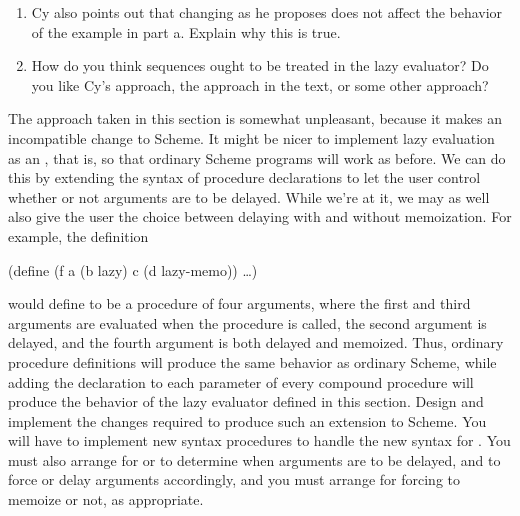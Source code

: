 \begin{exercise}
\begin{enumerate}[label = \alph*., leftmargin = *]
\begin{scheme}
			  (define (p2 x)
			    (define (p e)
			      e
			      x)
			    (p (set! x (cons x '(2)))))
			\end{scheme}
			What are the values of  and  with the original ?
			What would the values be with Cy’s proposed change to ?

		\item
			Cy also points out that changing  as he proposes does not affect the behavior of the example in part a.
			Explain why this is true.

		\item
			How do you think sequences ought to be treated in the lazy evaluator?
			Do you like Cy’s approach, the approach in the text, or some other approach?

	\end{enumerate}
\end{exercise}



\begin{exercise}
	\label{Exercise 4.31}
	The approach taken in this section is somewhat unpleasant, because it makes an incompatible change to Scheme.
	It might be nicer to implement lazy evaluation as an , that is, so that ordinary Scheme programs will work as before.
	We can do this by extending the syntax of procedure declarations to let the user control whether or not arguments are to be delayed.
	While we’re at it, we may as well also give the user the choice between delaying with and without memoization.
	For example, the definition
	\begin{scheme}
	  (define (f a (b lazy) c (d lazy-memo))
	    …)
	\end{scheme}
	would define  to be a procedure of four arguments, where the first and third arguments are evaluated when the procedure is called, the second argument is delayed, and the fourth argument is both delayed and memoized.
	Thus, ordinary procedure definitions will produce the same behavior as ordinary Scheme, while adding the  declaration to each parameter of every compound procedure will produce the behavior of the lazy evaluator defined in this section.
	Design and implement the changes required to produce such an extension to Scheme.
	You will have to implement new syntax procedures to handle the new syntax for .
	You must also arrange for  or  to determine when arguments are to be delayed, and to force or delay arguments accordingly, and you must arrange for forcing to memoize or not, as appropriate.
\end{exercise}



